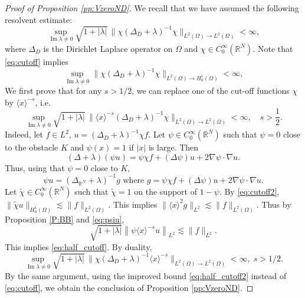 \documentclass[10pt,leqno]{amsart}
\DeclareMathOperator{\im}{Im} %
\theoremstyle{definition}%
\theoremstyle{remark}
\numberwithin{equation}{section}
\newcommand{\R}{\mathbb{R}}
\renewcommand{\^}{\widehat}%
\begin{document}
\begin{proof}[Proof of Proposition \ref{pp:VzeroND}]
	We recall that we have assumed the following resolvent estimate:
	\begin{equation}
	\label{eq:cutoff}
	\sup_{\im \lambda\neq 0}
	\sqrt{1+\lvert \lambda\rvert}\,
	\bigl\lVert \chi(\Delta_D+\lambda)^{-1}\chi\bigr\rVert_{L^2(\Omega)\to L^2(\Omega)}<\infty,
	\end{equation} 
	where $\Delta_D$ is the Dirichlet Laplace operator on $\Omega$ and $\chi\in C_0^{\infty}(\R^N)$. %
	Note that \eqref{eq:cutoff} implies
	\begin{equation}
	\label{eq:cutoff2}
	\sup_{\im \lambda\neq 0}
	\bigl\lVert \chi(\Delta_D+\lambda)^{-1}\chi\bigr\rVert_{L^2(\Omega)\to H^1_{0}(\Omega)}<\infty,
	\end{equation} 
	We first prove that for any $s>1/2$, we can replace one of the cut-off functions $\chi$ by $\langle x\rangle^{-s}$, i.e.
	\begin{equation}
	\label{eq:half_cutoff}
	\sup_{\im \lambda\neq 0}
	\sqrt{1+\lvert \lambda\rvert}\,
	\bigl\lVert \langle x\rangle^{-s}(\Delta_D+\lambda)^{-1}\chi\bigr\rVert_{L^2(\Omega)\to L^2(\Omega)}<\infty,\quad s>\frac 12.
	\end{equation} 
	Indeed, let $f\in L^2$, $u=(\Delta_D+\lambda)^{-1}\chi f$. Let $\psi\in C_0^{\infty}(\R^N)$ such that $\psi=0$ close to the obstacle $K$ and $\psi(x)=1$ if $|x|$ is large. Then 
	\begin{equation*}
	(\Delta+\lambda)(\psi u)=\psi\chi f+(\Delta \psi) u +2\nabla \psi\cdot\nabla u. 
	\end{equation*} 
	Thus, using that $\psi=0$ close to $K$,
	\begin{equation}
	 \label{eq:psiu}
\psi u=\left( \Delta_{\R^N}+\lambda\right)^{-1}g\text{ where }g=\psi\chi f+(\Delta \psi) u+2\nabla \psi\cdot\nabla u.
	 \end{equation} 
	Let $\tilde{\chi}\in C_0^{\infty}(\R^N)$ such that $\tilde{\chi}=1$ on the support of $1-\psi$. By \eqref{eq:cutoff2}, $\|\tilde{\chi}u\|_{H^1_0(\Omega)}\lesssim \|f\|_{L^2(\Omega)}$. This implies $\|\langle x\rangle^{2}g\|_{L^2}\lesssim \|f\|_{L^2(\Omega)}$. Thus by Proposition \ref{P:BB} and \eqref{eq:psiu},
	$$\sqrt{1+|\lambda|}\left\|\psi \langle x\rangle^{-s} u\right\|_{L^2}\lesssim \|f\|_{L^2}.$$
	This implies \eqref{eq:half_cutoff}. 
	By duality,
	\begin{equation}
	\label{eq:half_cutoff2}
	\sup_{\im \lambda\neq 0}
	\sqrt{1+\lvert \lambda\rvert}\,
	\bigl\lVert \chi(\Delta_D+\lambda)^{-1}\langle x\rangle^{-s}\bigr\rVert_{L^2(\Omega)\to L^2(\Omega)}<\infty, \;s>1/2.
	\end{equation} 
	By the same argument, using the improved bound \eqref{eq:half_cutoff2} instead of \eqref{eq:cutoff}, we obtain the conclusion of Proposition \ref{pp:VzeroND}.
\end{proof}
\end{document}
